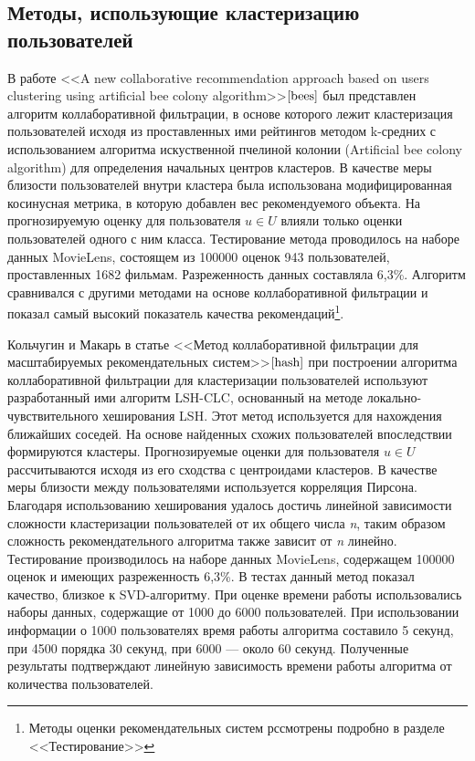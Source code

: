 \documentclass[a4paper, 12pt]{article} %
\begin{document}
\subsection{Методы, использующие кластеризацию пользователей}
\par
В работе <<A new collaborative recommendation approach based on users clustering using artificial bee colony algorithm>>$\cite{bees}$ был представлен алгоритм коллаборативной фильтрации, в основе которого лежит кластеризация пользователей исходя из проставленных ими рейтингов методом k-средних с использованием алгоритма искуственной пчелиной колонии (Artificial bee colony algorithm) для определения начальных центров кластеров. В качестве меры близости пользователей внутри кластера была использована модифицированная косинусная метрика, в которую добавлен вес рекомендуемого объекта. На прогнозируемую оценку для пользователя $u \in U$  влияли только оценки пользователей одного с ним класса. Тестирование метода проводилось на наборе данных MovieLens, состоящем из 100000 оценок 943 пользователей, проставленных 1682 фильмам. Разреженность данных составляла 6,3\%. Алгоритм сравнивался с другими методами на основе коллаборативной фильтрации и показал самый высокий показатель качества рекомендаций\footnote{Методы оценки рекомендательных систем рссмотрены подробно в разделе <<Тестирование>>}.

\par 
Кольчугин и Макарь в статье <<Метод коллаборативной фильтрации для масштабируемых рекомендательных систем>>$\cite{hash}$ при построении алгоритма коллаборативной фильтрации для кластеризации пользователей используют разработанный ими алгоритм LSH-CLC, основанный на методе локально-чувствительного хеширования LSH. Этот метод используется для нахождения ближайших соседей. На основе найденных схожих пользователей впоследствии формируются кластеры. Прогнозируемые оценки для пользователя $u \in U$ рассчитываются исходя из его сходства с центроидами кластеров. В качестве меры близости между пользователями используется корреляция Пирсона. Благодаря использованию хеширования удалось достичь линейной зависимости сложности кластеризации пользователей от их общего числа \textit{n}, таким образом сложность рекомендательного алгоритма также зависит от \textit{n} линейно. Тестирование производилось на наборе данных MovieLens, содержащем 100000 оценок и имеющих разреженность 6,3\%. В тестах данный метод показал качество, близкое к SVD-алгоритму. При оценке времени работы использовались наборы данных, содержащие от 1000 до 6000 пользователей. При использовании информации о 1000 пользователях время работы алгоритма составило 5 секунд, при 4500 порядка 30 секунд, при 6000 --- около 60 секунд. Полученные результаты подтверждают линейную зависимость времени работы алгоритма от количества пользователей.  
\end{document}
